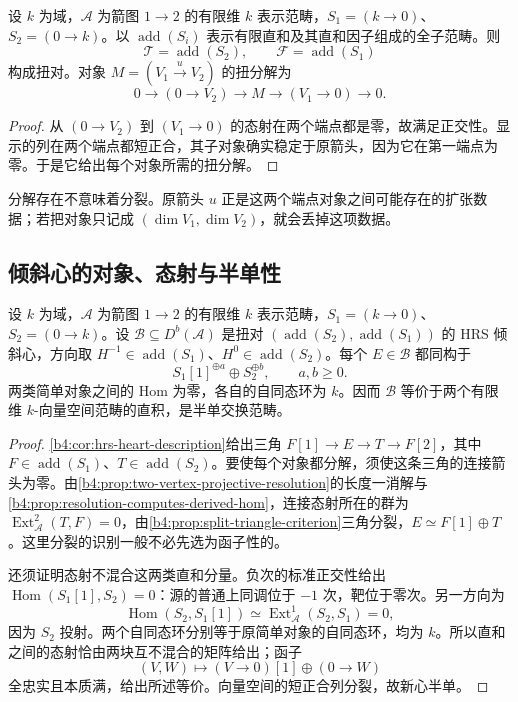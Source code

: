 \begin{proposition}\label{b4:prop:two-vertex-torsion-pair}
	设 \(k\) 为域，\(\mathcal A\) 为箭图 \(1\to2\) 的有限维 \(k\) 表示范畴，\(S_1=(k\to0)\)、\(S_2=(0\to k)\)。以 \(\operatorname{add}(S_i)\) 表示有限直和及其直和因子组成的全子范畴。则
	\[
		\mathcal T=\operatorname{add}(S_2),\qquad \mathcal F=\operatorname{add}(S_1)
	\]
	构成扭对。对象 \(M=(V_1\xrightarrow{u}V_2)\) 的扭分解为
	\[
		0\longrightarrow(0\to V_2)\longrightarrow M \longrightarrow(V_1\to0)\longrightarrow0.
	\]
\end{proposition}
\begin{proof}
	从 \((0\to V_2)\) 到 \((V_1\to0)\) 的态射在两个端点都是零，故满足正交性。显示的列在两个端点都短正合，其子对象确实稳定于原箭头，因为它在第一端点为零。于是它给出每个对象所需的扭分解。
\end{proof}

分解存在不意味着分裂。原箭头 \(u\) 正是这两个端点对象之间可能存在的扩张数据；若把对象只记成 \((\dim V_1,\dim V_2)\)，就会丢掉这项数据。

\subsection{倾斜心的对象、态射与半单性}
\label{b4:subsec:1905:03}

\begin{theorem}\label{b4:thm:two-vertex-tilted-heart}
	设 \(k\) 为域，\(\mathcal A\) 为箭图 \(1\to2\) 的有限维 \(k\) 表示范畴，\(S_1=(k\to0)\)、\(S_2=(0\to k)\)。设 \(\mathcal B\subseteq D^b(\mathcal A)\) 是扭对 \((\operatorname{add}(S_2),\operatorname{add}(S_1))\) 的 HRS 倾斜心，方向取 \(H^{-1}\in\operatorname{add}(S_1)\)、\(H^0\in\operatorname{add}(S_2)\)。每个 \(E\in\mathcal B\) 都同构于
	\[
		S_1[1]^{\oplus a}\oplus S_2^{\oplus b},\qquad a,b\ge0.
	\]
	两类简单对象之间的 Hom 为零，各自的自同态环为 \(k\)。因而 \(\mathcal B\) 等价于两个有限维 \(k\)-向量空间范畴的直积，是半单交换范畴。
\end{theorem}
\begin{proof}
	\cref{b4:cor:hrs-heart-description}给出三角 \(F[1]\to E\to T\to F[2]\)，其中 \(F\in\operatorname{add}(S_1)\)、\(T\in\operatorname{add}(S_2)\)。要使每个对象都分解，须使这条三角的连接箭头为零。由\cref{b4:prop:two-vertex-projective-resolution}的长度一消解与\cref{b4:prop:resolution-computes-derived-hom}，连接态射所在的群为 \(\operatorname{Ext}_{\mathcal A}^2(T,F)=0\)，由\cref{b4:prop:split-triangle-criterion}三角分裂，\(E\simeq F[1]\oplus T\)。这里分裂的识别一般不必先选为函子性的。

	还须证明态射不混合这两类直和分量。负次的标准正交性给出 \(\operatorname{Hom}(S_1[1],S_2)=0\)：源的普通上同调位于 \(-1\) 次，靶位于零次。另一方向为
	\[
		\operatorname{Hom}(S_2,S_1[1])\simeq\operatorname{Ext}_{\mathcal A}^1(S_2,S_1)=0,
	\]
	因为 \(S_2\) 投射。两个自同态环分别等于原简单对象的自同态环，均为 \(k\)。所以直和之间的态射恰由两块互不混合的矩阵给出；函子
	\[
		(V,W)\longmapsto(V\to0)[1]\oplus(0\to W)
	\]
	全忠实且本质满，给出所述等价。向量空间的短正合列分裂，故新心半单。
\end{proof}

